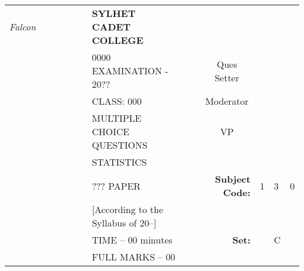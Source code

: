 \documentclass[12pt]{exam}
\begin{document}
\iffalse

\begin{table}[]
\begin{tabular}{lllllllllrlll}
\textit{Falcon} &  &  &  &  &  & \textbf{SYLHET CADET COLLEGE}       &  &                       & \multicolumn{1}{l}{}                        &                        &                        &                        \\ \cline{10-13} 
       &  &  &  &  &  & 0000 EXAMINATION - 20??             &  & \multicolumn{1}{l|}{} & \multicolumn{1}{c|}{Ques Setter}            & \multicolumn{3}{l|}{}                                                    \\ \cline{10-13} 
       &  &  &  &  &  & CLASS: 000                          &  & \multicolumn{1}{l|}{} & \multicolumn{1}{c|}{Moderator}              & \multicolumn{3}{l|}{}                                                    \\ \cline{10-13} 
       &  &  &  &  &  & MULTIPLE CHOICE QUESTIONS           &  & \multicolumn{1}{l|}{} & \multicolumn{1}{c|}{VP}                     & \multicolumn{3}{l|}{}                                                    \\ \cline{10-13} 
       &  &  &  &  &  & STATISTICS                          &  &                       &                                             &                        &                        &                        \\ \cline{11-13} 
       &  &  &  &  &  & ??? PAPER                        &  &                       & \multicolumn{1}{r|}{\textbf{Subject Code:}} & \multicolumn{1}{l|}{1} & \multicolumn{1}{l|}{3} & \multicolumn{1}{l|}{0} \\ \cline{11-13} 
       &  &  &  &  &  & [According to the Syllabus of 20--] &  &                       &                                             &                        &                        &                        \\ \cline{12-12}
       &  &  &  &  &  & TIME – 00 minutes                   &  &                       & \textbf{Set:}                               & \multicolumn{1}{l|}{}  & \multicolumn{1}{l|}{C} &                        \\ \cline{12-12}
       &  &  &  &  &  & FULL MARKS – 00                     &  &                       & \multicolumn{1}{l}{}                        &                        &                        &                       
\end{tabular}
\end{table}
\end{document}
